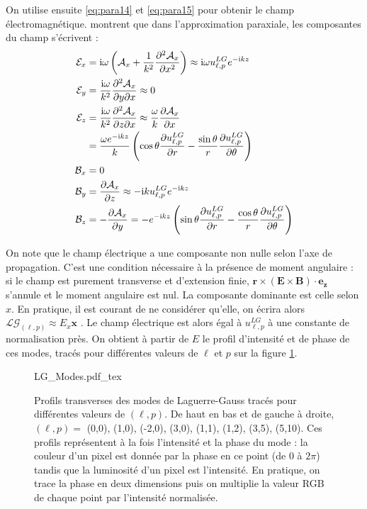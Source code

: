 On utilise ensuite \ref{eq:para14} et \ref{eq:para15} pour obtenir le champ électromagnétique.  montrent que dans l'approximation paraxiale, les composantes du champ s'écrivent :
\begin{align}
\mathcal{E}_x &= \mathrm{i} \omega
\left(\mathcal{A}_x+\frac{1}{k^2}\frac{\partial^2 \mathcal{A}_x}{\partial x^2}\right)\approx \mathrm{i}\omega u^{LG}_{\ell,p}e^{-\mathrm{i} k z} \\
\mathcal{E}_y &= \frac{\mathrm{i} \omega}{k^2}
\frac{\partial^2 \mathcal{A}_x}{\partial y \partial x}\approx 0 \\
\mathcal{E}_z &= \frac{\mathrm{i} \omega}{k^2}
\frac{\partial^2 \mathcal{A}_x}{\partial z \partial x}\approx 
\frac{\omega}{k}\frac{\partial \mathcal{A}_x}{\partial x}\\
&= \frac{\omega e^{-\mathrm{i} k z}}{k}\left(\cos{\theta}\frac{\partial u^{LG}_{\ell,p}}{\partial r}-\frac{\sin \theta}{r} \frac{\partial u^{LG}_{\ell,p}}{\partial \theta}\right)\\
\mathcal{B}_x &= 0 \\
\mathcal{B}_y &= \frac{\partial \mathcal{A}_x}{\partial z} \approx -\mathrm{i} k u^{LG}_{\ell,p} e^{-\mathrm{i} k z}\\
\mathcal{B}_z &= -\frac{\partial \mathcal{A}_x}{\partial y}
=-e^{-\mathrm{i} k z}\left(\sin{\theta}\frac{\partial u^{LG}_{\ell,p}}{\partial r}-\frac{\cos \theta}{r} \frac{\partial u^{LG}_{\ell,p}}{\partial \theta}\right)\\
\end{align}

On note que le champ électrique a une composante non nulle selon l'axe de propagation. C'est une condition nécessaire à la présence de moment angulaire : si le champ est purement transverse et d'extension finie, $\bm{r}\times(\bm{E}\times\bm{B})\cdot\bm{e_z}$ s'annule et le moment angulaire est nul. La composante dominante est celle selon $x$. En pratique, il est courant de ne considérer qu'elle, on écrira alors $\mathcal{LG}_{(\ell,p)} \approx E_x \bm{x}$ . Le champ électrique est alors égal à $u^{LG}_{\ell,p}$ à une constante de normalisation près. On obtient à partir de $E$ le profil d'intensité et de phase de ces modes,  tracés pour différentes valeurs de $\ell$ et $p$ sur la figure \ref{Fig:LGModes}.

\begin{figure}[!ht]
\centering
\def\svgwidth{\columnwidth}
{LG_Modes.pdf_tex}
\caption{Profils transverses des modes de Laguerre-Gauss tracés pour différentes valeurs de $(\ell,p)$. De haut en bas et de gauche à droite, $(\ell,p) =$ (0,0), (1,0), (-2,0), (3,0), (1,1), (1,2), (3,5), (5,10). Ces profils représentent à la fois l'intensité et la phase du mode : la couleur d'un pixel est donnée par la phase en ce point (de 0 à $2\pi$) tandis que la luminosité d'un pixel est l'intensité. En pratique, on trace la phase en deux dimensions puis on multiplie la valeur RGB de chaque point par l'intensité normalisée.}
\label{Fig:LGModes}
\end{figure}

